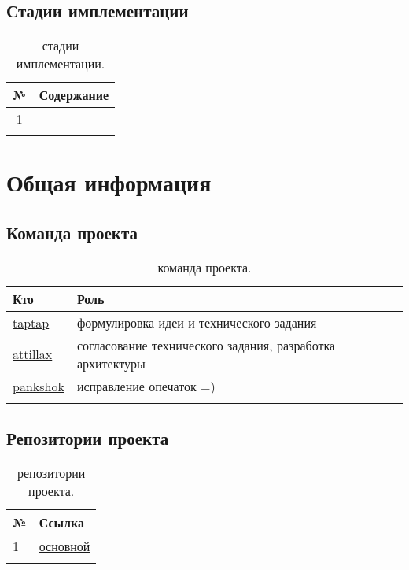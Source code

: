 \documentclass[12pt,a4paper,fullpage,titlepage]{article}
\begin{document}
\subsection{Стадии имплементации}

\begin{table}[h]
\begin{tabularx}{\textwidth}{|c|X|}
	\hline
	№ & Содержание\\
	\hline
	1 & \\
	\hline
	& \\
	\hline
\end{tabularx}
\caption{стадии имплементации.}
\end{table}

\newpage
\section{Общая информация}
\subsection{Команда проекта}
\begin{table}[h]
	\begin{tabularx}{\textwidth}{|l|X|}
		\hline
		Кто & Роль \\
		\hline
		\href{https://github.com/taptap/}{taptap} & формулировка идеи и технического задания\\
		\hline
		\href{https://github.com/attillax}{attillax} & согласование технического задания, разработка архитектуры\\
		\hline
		\href{https://github.com/pankshok}{pankshok} & исправление опечаток =)\\
		\hline
		& \\
		\hline
	\end{tabularx}
	\caption{команда проекта.}
\end{table}

\subsection{Репозитории проекта}
\begin{table}[h]
	\begin{tabularx}{\textwidth}{|l|X|}
		\hline
		№ & Ссылка \\
		\hline
		1 & \href{https://github.com/taptap/ladders}{основной} \\
		\hline
		& \\
		\hline
	\end{tabularx}
	\caption{репозитории проекта.}
\end{table}
\end{document}
